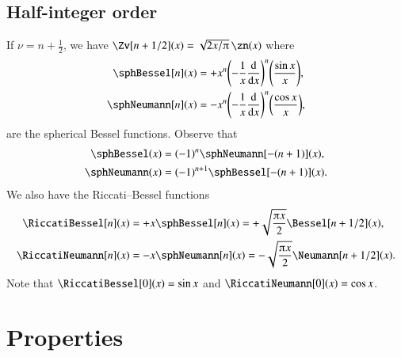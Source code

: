     \subsection{Half-integer order}
        If $\nu=n+\frac{1}{2}$, we have $\Zv[n+1/2](x) = \sqrt{2x/\ppi}\, \zn(x)$ where
        \begin{subequations}
            \begin{align}
                \sphBessel[n](x) &= +x^n \pclosed{-\frac{1}{x} \dv{}{x}}^n \pclosed{ \frac{\sin{x}}{x}}  ,\\
                \sphNeumann[n](x) &= - x^n \pclosed{-\frac{1}{x} \dv{}{x}}^n \pclosed{ \frac{\cos{x}}{x}},
            \end{align}
        \end{subequations}
        are the spherical Bessel functions. %
        Observe that 
        \begin{subequations}
            \begin{align}
                \sphBessel(x) &= (-1)^n \sphNeumann[-(n+1)](x), \\
                \sphNeumann(x) &= (-1)^{n+1} \sphBessel[-(n+1)](x). \\
            \end{align}
        \end{subequations}
        We also have the Riccati--Bessel functions
        \begin{subequations}\label{eq:cylinder:Riccati_Bessel}
            \begin{align}
                \RiccatiBessel[n](x) &= +x\sphBessel[n](x) = +\sqrt{\frac{\ppi x}{2}} \Bessel[n+1/2](x),\\
                \RiccatiNeumann[n](x) &= -x\sphNeumann[n](x)  = -\sqrt{\frac{\ppi x}{2}} \Neumann[n+1/2](x).
            \end{align}
        \end{subequations}
        Note that $\RiccatiBessel[0](x)= \sin{x}$ and $\RiccatiNeumann[0](x)=\cos{x}$.

        







\section{Properties}
